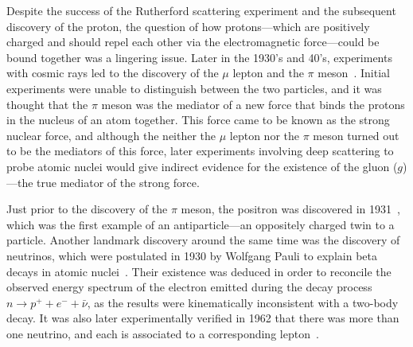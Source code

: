 Despite the success of the Rutherford scattering experiment and the subsequent discovery of the proton, the question of how protons---which are positively charged and should repel each other via the electromagnetic force---could be bound together was a lingering issue.
Later in the 1930's and 40's, experiments with cosmic rays led to the discovery of the $\mu$ lepton and the $\pi$ meson~\cite{Lattes_1947}.
Initial experiments were unable to distinguish between the two particles, and it was thought that the $\pi$ meson was the mediator of a new force that binds the protons in the nucleus of an atom together.
This force came to be known as the strong nuclear force, and although the neither the $\mu$ lepton nor the $\pi$ meson turned out to be the mediators of this force, later experiments involving deep scattering to probe atomic nuclei would give indirect evidence for the existence of the gluon ($g$)---the true mediator of the strong force.

Just prior to the discovery of the $\pi$ meson, the positron was discovered in 1931~\cite{doi:10.1119/1.1937627}, which was the first example of an antiparticle---an oppositely charged twin to a particle.
Another landmark discovery around the same time was the discovery of neutrinos, which were postulated in 1930 by Wolfgang Pauli to explain beta decays in atomic nuclei~\cite{Reines-Cowan}.
Their existence was deduced in order to reconcile the observed energy spectrum of the electron emitted during the decay process $n\to p^++e^-+\bar{\nu}$, as the results were kinematically inconsistent with a two-body decay.
It was also later experimentally verified in 1962 that there was more than one neutrino, and each is associated to a corresponding lepton~\cite{doi:10.1119/1.1976245}.


